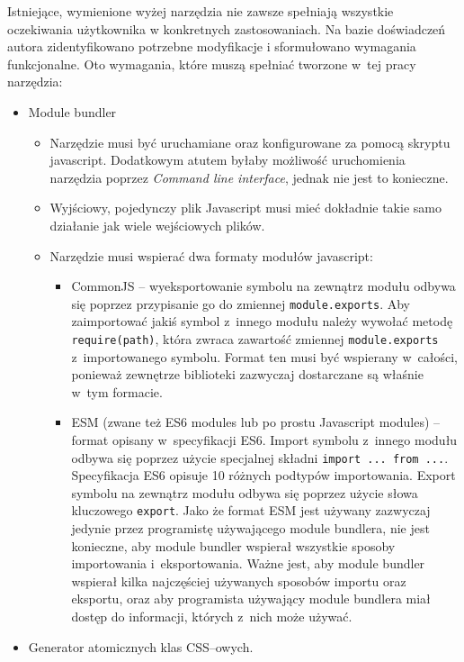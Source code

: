 \documentclass{SGGW-thesis}
\begin{document}
Istniejące, wymienione wyżej narzędzia nie zawsze spełniają wszystkie oczekiwania użytkownika w konkretnych zastosowaniach. Na bazie doświadczeń autora zidentyfikowano potrzebne modyfikacje i sformułowano wymagania funkcjonalne. Oto wymagania, które muszą spełniać tworzone w~tej pracy narzędzia:
\begin{itemize}
    \item Module bundler
    \begin{itemize}
        \item Narzędzie musi być uruchamiane oraz konfigurowane za pomocą skryptu javascript. Dodatkowym atutem byłaby możliwość uruchomienia narzędzia poprzez \emph{Command line interface}, jednak nie jest to konieczne.
        \item Wyjściowy, pojedynczy plik Javascript musi mieć dokładnie takie samo działanie jak wiele wejściowych plików.
        \item Narzędzie musi wspierać dwa formaty modułów javascript:
        \begin{itemize}
            \item CommonJS -- wyeksportowanie symbolu na zewnątrz modułu odbywa się poprzez przypisanie go do zmiennej \verb|module.exports|. Aby zaimportować jakiś symbol z~innego modułu należy wywołać metodę \verb|require(path)|, która zwraca zawartość zmiennej \verb|module.exports| z~importowanego symbolu. Format ten musi być wspierany w~całości, ponieważ zewnętrze biblioteki zazwyczaj dostarczane są właśnie w~tym formacie.
            \item ESM (zwane też ES6 modules lub po prostu Javascript modules) -- format opisany w~specyfikacji ES6. Import symbolu z~innego modułu odbywa się poprzez użycie specjalnej składni \verb|import ... from ...|. Specyfikacja ES6 opisuje 10 różnych podtypów importowania\cite{es6_modules_import}. Export symbolu na zewnątrz modułu odbywa się poprzez użycie słowa kluczowego \verb|export|\cite{es6_modules_export}. Jako że format ESM jest używany zazwyczaj jedynie przez programistę używającego module bundlera, nie jest konieczne, aby module bundler wspierał wszystkie sposoby importowania i~eksportowania. Ważne jest, aby module bundler wspierał kilka najczęściej używanych sposobów importu oraz eksportu, oraz aby programista używający module bundlera miał dostęp do informacji, których z~nich może używać.
        \end{itemize}
    \end{itemize}
    \item Generator atomicznych klas CSS--owych.

\end{itemize}
\end{document}

